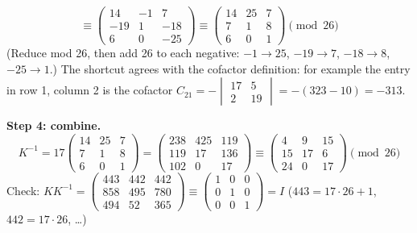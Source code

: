 \[
\equiv
\begin{pmatrix}14&-1&7\\-19&1&-18\\6&0&-25\end{pmatrix}
\equiv
\begin{pmatrix}14&25&7\\7&1&8\\6&0&1\end{pmatrix} \pmod{26}
\]
(Reduce mod 26, then add 26 to each negative: $-1\to25$, $-19\to7$, $-18\to8$, $-25\to1$.) The shortcut agrees with the cofactor definition: for example the entry in row 1, column 2 is the cofactor $C_{21} = -\begin{vmatrix}17&5\\2&19\end{vmatrix} = -(323 - 10) = -313$.

\textbf{Step 4: combine.}
\[
K^{-1} = 17\begin{pmatrix}14&25&7\\7&1&8\\6&0&1\end{pmatrix}
= \begin{pmatrix}238&425&119\\119&17&136\\102&0&17\end{pmatrix}
\equiv \boxed{\begin{pmatrix}4&9&15\\15&17&6\\24&0&17\end{pmatrix}} \pmod{26}
\]
Check: $KK^{-1} = \begin{pmatrix}443&442&442\\858&495&780\\494&52&365\end{pmatrix} \equiv \begin{pmatrix}1&0&0\\0&1&0\\0&0&1\end{pmatrix} = I$ \checkmark\;
($443 = 17\cdot26+1$, $442 = 17\cdot26$, \dots)

